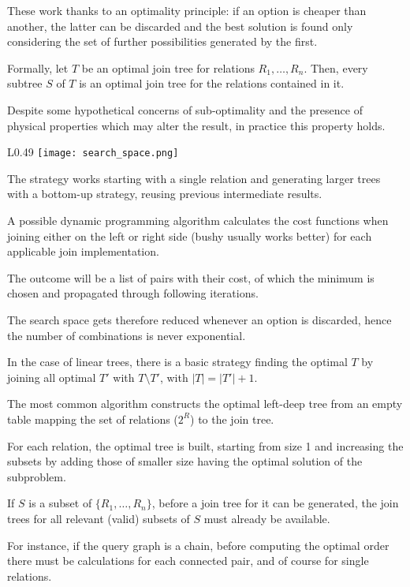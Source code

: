 These work thanks to an optimality principle: if an option is cheaper than another, the latter can be discarded and the best solution is found only considering the set of further possibilities generated by the first.

Formally, let $T$ be an optimal join tree for relations $R_1, \dots, R_n$. Then, every subtree $S$ of $T$ is an optimal join tree for the relations contained in it.

Despite some hypothetical concerns of sub-optimality and the presence of physical properties which may alter the result, in practice this property holds.

\begin{wrapfigure}{L}{0.49\textwidth}
	\vspace{-10pt}
	\texttt{[image: search\_space.png]}
	\vspace{-40pt}
\end{wrapfigure}

The strategy works starting with a single relation and generating larger trees with a bottom-up strategy, reusing previous intermediate results.

A possible dynamic programming algorithm calculates the cost functions when joining either on the left or right side (bushy usually works better) for each applicable join implementation. 

The outcome will be a list of pairs with their cost, of which the minimum is chosen and propagated through following iterations.

The search space gets therefore reduced whenever an option is discarded, hence the number of combinations is never exponential.

In the case of linear trees, there is a basic strategy finding the optimal $T$ by joining all optimal $T'$ with $T \setminus T'$, with $|T| = |T'| + 1$.

The most common algorithm constructs the optimal left-deep tree from an empty table mapping the set of relations ($2^R$) to the join tree. 

For each relation, the optimal tree is built, starting from size 1 and increasing the subsets by adding those of smaller size having the optimal solution of the subproblem.

If $S$ is a subset of $\{R_1, \dots, R_n\}$, before a join tree for it can be generated, the join trees for all relevant (valid) subsets of $S$ must already be available.

For instance, if the query graph is a chain, before computing the optimal order there must be calculations for each connected pair, and of course for single relations.

